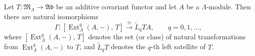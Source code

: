 \begin{theorem}\label{thm:10.1}
Let $T \colon \mathfrak{M}_\Lambda \to \mathfrak{Ab}$ be an additive covariant functor and let $A$ be a $\Lambda$-module. Then there are natural isomorphisms
$$
\Gamma \colon [\operatorname{Ext}_\Lambda^q(A, -),\, T] \xrightarrow{\cong} \tilde{L}_q TA, \qquad q = 0, 1, \dots,
$$
where $[\operatorname{Ext}_\Lambda^q(A, -),\, T]$ denotes the set (or class) of natural transformations from $\operatorname{Ext}_\Lambda^q(A, -)$ to $T$, and $\tilde{L}_q T$ denotes the $q$-th left satellite of $T$.
\end{theorem}
